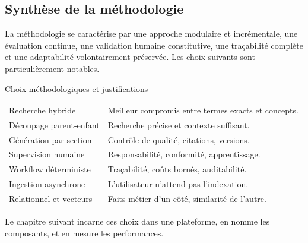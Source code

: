 \subsection{Synthèse de la méthodologie}

La méthodologie se caractérise par une approche modulaire et incrémentale,
une évaluation continue, une validation humaine constitutive, une
traçabilité complète et une adaptabilité volontairement préservée. Les
choix suivants sont particulièrement notables.

\begin{btptable}{Choix méthodologiques et justifications}
\label{tab:choix-methodo}
\begin{tabularx}{\linewidth}{@{}L{4.2cm} Y@{}}
\toprule
{}
 &  \\
\midrule
Recherche hybride & Meilleur compromis entre termes exacts et concepts. \\
Découpage parent-enfant & Recherche précise et contexte suffisant. \\
Génération par section & Contrôle de qualité, citations, versions. \\
Supervision humaine & Responsabilité, conformité, apprentissage. \\
Workflow déterministe & Traçabilité, coûts bornés, auditabilité. \\
Ingestion asynchrone & L'utilisateur n'attend pas l'indexation. \\
Relationnel et vecteurs & Faits métier d'un côté, similarité de l'autre. \\
\bottomrule
\end{tabularx}
\end{btptable}

Le chapitre suivant incarne ces choix dans une plateforme, en nomme les
composants, et en mesure les performances.

\btpEndMark
